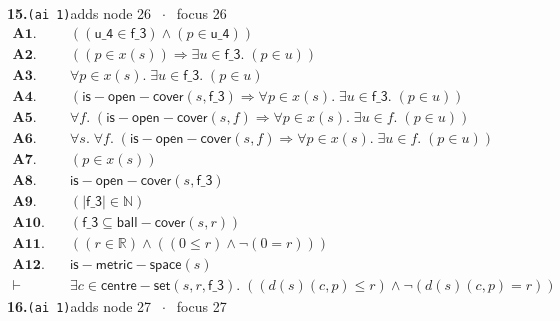 \documentclass[11pt]{article}
\begin{document}
\medskip\noindent\textbf{15.}\quad \texttt{(ai 1)}\hfill{\small adds node 26 $\;\cdot\;$ focus 26}\\[2pt]
\begin{align*}
  \mathbf{A1.}\quad & ((\mathsf{u\_4} \in \mathsf{f\_3}) \wedge (p \in \mathsf{u\_4})) \\
  \mathbf{A2.}\quad & ((p \in x(s)) \Rightarrow \exists u \in \mathsf{f\_3}.\; (p \in u)) \\
  \mathbf{A3.}\quad & \forall p \in x(s).\; \exists u \in \mathsf{f\_3}.\; (p \in u) \\
  \mathbf{A4.}\quad & (\mathsf{is{-}open{-}cover}(s, \mathsf{f\_3}) \Rightarrow \forall p \in x(s).\; \exists u \in \mathsf{f\_3}.\; (p \in u)) \\
  \mathbf{A5.}\quad & \forall f.\; (\mathsf{is{-}open{-}cover}(s, f) \Rightarrow \forall p \in x(s).\; \exists u \in f.\; (p \in u)) \\
  \mathbf{A6.}\quad & \forall s.\; \forall f.\; (\mathsf{is{-}open{-}cover}(s, f) \Rightarrow \forall p \in x(s).\; \exists u \in f.\; (p \in u)) \\
  \mathbf{A7.}\quad & (p \in x(s)) \\
  \mathbf{A8.}\quad & \mathsf{is{-}open{-}cover}(s, \mathsf{f\_3}) \\
  \mathbf{A9.}\quad & (|\mathsf{f\_3}| \in \mathbb{N}) \\
  \mathbf{A10.}\quad & (\mathsf{f\_3} \subseteq \mathsf{ball{-}cover}(s, r)) \\
  \mathbf{A11.}\quad & ((r \in \mathbb{R}) \wedge ((0 \leq r) \wedge \neg (0 = r))) \\
  \mathbf{A12.}\quad & \mathsf{is{-}metric{-}space}(s) \\
  \vdash\quad & \exists c \in \mathsf{centre{-}set}(s, r, \mathsf{f\_3}).\; ((d(s)(c, p) \leq r) \wedge \neg (d(s)(c, p) = r))
\end{align*}
\medskip\noindent\textbf{16.}\quad \texttt{(ai 1)}\hfill{\small adds node 27 $\;\cdot\;$ focus 27}\\[2pt]
\end{document}
